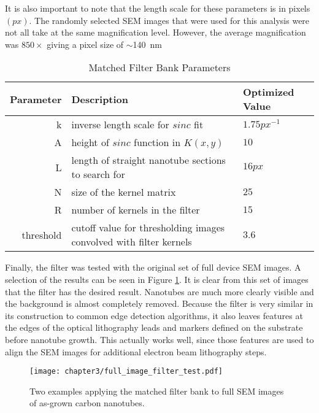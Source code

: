It is also important to note that the length scale for these parameters is in pixels $(px)$. The randomly selected SEM images that were used for this analysis were not all take at the same magnification level. However, the average magnification was $850\times$ giving a pixel size of $\sim$\SI{140}{\nano\meter}

\begin{table}
	\centering
	\caption{Matched Filter Bank Parameters}
    \begin{tabular}{| r | p{60mm} | l |}
    	\hline
    	\textbf{Parameter} & \textbf{Description} & \textbf{Optimized Value}  \\ \hline
    	k & inverse length scale for $sinc$ fit &  $1.75 px^{-1}$ \\ \hline
    	A & height of $sinc$ function in $K(x,y)$ &  $10$ \\ \hline
    	L & length of straight nanotube sections to search for &  $16 px$ \\ \hline
    	N & size of the kernel matrix &  $25$ \\ \hline
        R & number of kernels in the filter & $15$ \\ \hline
        threshold & cutoff value for thresholding images convolved with filter kernels & $3.6$ \\ \hline
    \end{tabular}
    \label{table:filter_parameters}
\end{table}

Finally, the filter was tested with the original set of full device SEM images. A selection of the results can be seen in Figure \ref{fig:full_image_filter}. It is clear from this set of images that the filter has the desired result. Nanotubes are much more clearly visible and the background is almost completely removed. Because the filter is very similar in its construction to common edge detection algorithms, it also leaves features at the edges of the optical lithography leads and markers defined on the substrate before nanotube growth. This actually works well, since those features are used to align the SEM images for additional electron beam lithography steps. 

\begin{figure}
	\centering
	\texttt{[image: chapter3/full\_image\_filter\_test.pdf]}
	\caption{Two examples applying the matched filter bank to full SEM images of as-grown carbon nanotubes.}
	\label{fig:full_image_filter}
\end{figure}